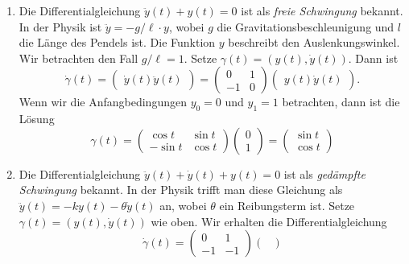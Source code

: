 \documentclass[../main.tex]{subfiles}
\begin{document}
\begin{examples}
  \leavevmode
  \begin{enumerate}[(1)]
    \item Die Differentialgleichung $\ddot y(t) + y(t) = 0$ 
      ist als
      \emph{freie Schwingung}
      bekannt. In der Physik ist $\ddot y = -g/\ell \cdot y$,
      wobei $g$ die Gravitationsbeschleunigung und $l$ 
      die Länge des Pendels ist.
      Die Funktion $y$ beschreibt den Auslenkungswinkel.
      Wir betrachten den Fall $g/\ell = 1$.
      Setze $\gamma(t) = (y(t), \dot y(t))$.
      Dann ist
      \[
        \dot \gamma(t) =
        \begin{pmatrix}
          \dot y(t)
          \ddot y(t)
        \end{pmatrix}
        =
        \begin{pmatrix}
          0 & 1 \\ -1 & 0
        \end{pmatrix}
        \begin{pmatrix}
          y(t)
          \dot y(t)
        \end{pmatrix}.
      \]
      Wenn wir die Anfangbedingungen $y_0 = 0$ 
      und $y_1 = 1$ betrachten, dann ist die Lösung
      \[
        \gamma(t) =
        \begin{pmatrix}
          \cos t & \sin t \\
          -\sin t & \cos t
        \end{pmatrix}
        \begin{pmatrix}
          0 \\ 1
        \end{pmatrix}
        =
        \begin{pmatrix}
          \sin t\\
          \cos t
        \end{pmatrix}
      \]
    \item Die Differentialgleichung
      $\ddot y(t) + \dot y(t) + y(t) = 0$ 
      ist als \emph{gedämpfte Schwingung} bekannt.
      In der Physik trifft man diese Gleichung
      als $\ddot y(t) = -ky(t) - \theta \dot y (t)$ an,
      wobei $\theta$ ein Reibungsterm ist.
      Setze $\gamma(t) = (y(t), \dot y(t))$ wie oben.
      Wir erhalten die Differentialgleichung
      \[
        \dot \gamma(t) =
        \begin{pmatrix}
          0 & 1 \\
          -1 & -1
        \end{pmatrix}
        \begin{pmatrix}

\end{pmatrix}\]
\end{enumerate}
\end{examples}
\end{document}
